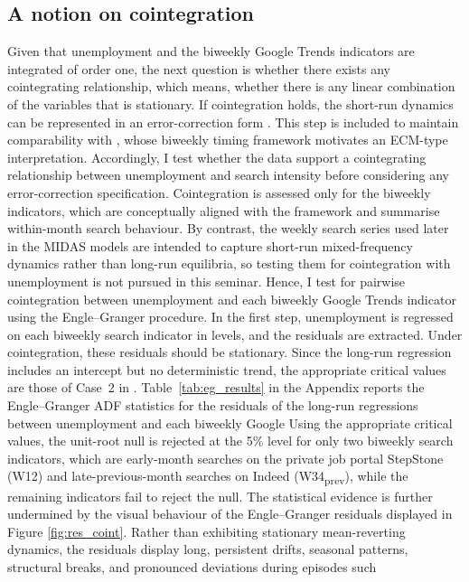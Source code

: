 \documentclass[12pt,a4paper]{article}
\begin{document}
\subsection{A notion on cointegration}
Given that unemployment and the biweekly Google Trends indicators are integrated of order one, the next question is whether there exists any cointegrating relationship, which means, whether there is any linear combination of the variables that is stationary. If cointegration holds, the short-run dynamics can be represented in an error-correction form \citep{engle}. This step is included to maintain comparability with \citet{Askitas}, whose biweekly timing framework motivates an ECM-type interpretation. Accordingly, I test whether the data support a cointegrating relationship between unemployment and search intensity before considering any error-correction specification.
Cointegration is assessed only for the biweekly indicators, which are conceptually aligned with the \citet{Askitas} framework and summarise within-month search behaviour. By contrast, the weekly search series used later in the MIDAS models are intended to capture short-run mixed-frequency dynamics rather than long-run equilibria, so testing them for cointegration with unemployment is not pursued in this seminar.
Hence, I test for pairwise cointegration between unemployment and each biweekly Google Trends indicator using the Engle--Granger procedure.
 In the first step, unemployment is 
regressed on each biweekly search indicator in levels, and the residuals are extracted. Under cointegration, these residuals should 
be stationary. Since the long-run regression includes an intercept but no deterministic trend, the appropriate critical values are those of Case~2 in \citet[p.~766]{hamilton}.
Table~\ref{tab:eg_results} in the Appendix reports the Engle--Granger ADF statistics for the 
residuals of the long-run regressions between unemployment and each biweekly Google 
Using the appropriate critical values, the unit-root null is rejected at the 5\% level for only two biweekly search indicators, which are early-month searches on the private job portal StepStone (W12) and late-previous-month searches on Indeed (W34\textsubscript{prev}), while the remaining indicators fail to reject the null. 
The statistical evidence is further undermined by the visual behaviour of the 
Engle--Granger residuals displayed in Figure \ref{fig:res_coint}.
Rather than exhibiting 
stationary mean-reverting dynamics, the residuals display long, persistent drifts, 
seasonal patterns, structural breaks, and pronounced deviations during episodes such 
\end{document}
